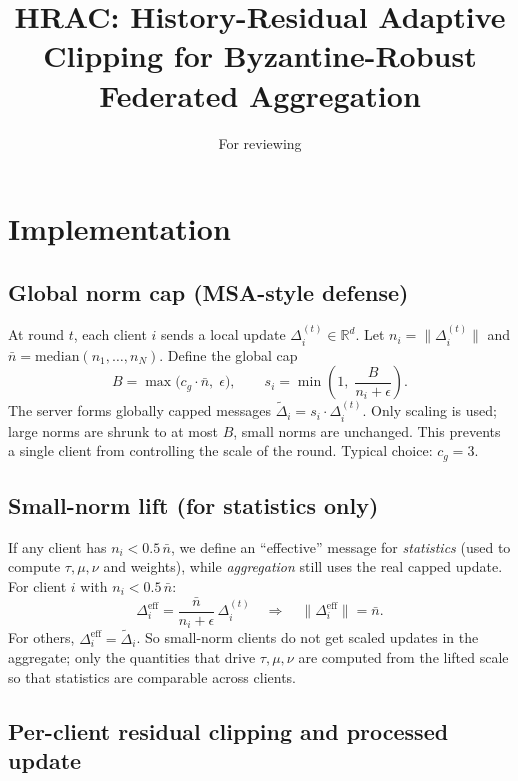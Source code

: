 \documentclass[11pt,a4paper]{article}
\title{HRAC: History-Residual Adaptive Clipping for Byzantine-Robust Federated Aggregation}
\author{For reviewing}
\date{}
\begin{document}
\maketitle


\section{Implementation}

\subsection{Global norm cap (MSA-style defense)}

At round $t$, each client $i$ sends a local update $\Delta_i^{(t)} \in \mathbb{R}^d$. Let $n_i = \|\Delta_i^{(t)}\|$ and $\bar{n} = \mathrm{median}(n_1,\ldots,n_N)$. Define the global cap
\begin{equation}
  B = \max\bigl(c_g \cdot \bar{n},\; \epsilon\bigr), \qquad
  s_i = \min\left(1,\; \frac{B}{n_i + \epsilon}\right).
\end{equation}
The server forms globally capped messages $\widetilde{\Delta}_i = s_i \cdot \Delta_i^{(t)}$. Only scaling is used; large norms are shrunk to at most $B$, small norms are unchanged. This prevents a single client from controlling the scale of the round. Typical choice: $c_g = 3$.

\subsection{Small-norm lift (for statistics only)}

If any client has $n_i < 0.5\,\bar{n}$, we define an ``effective'' message for \emph{statistics} (used to compute $\tau,\mu,\nu$ and weights), while \emph{aggregation} still uses the real capped update. For client $i$ with $n_i < 0.5\,\bar{n}$:
\begin{equation}
  \Delta_i^{\mathrm{eff}} = \frac{\bar{n}}{n_i + \epsilon}\,\Delta_i^{(t)} \quad \Rightarrow \quad \|\Delta_i^{\mathrm{eff}}\| = \bar{n}.
\end{equation}
For others, $\Delta_i^{\mathrm{eff}} = \widetilde{\Delta}_i$. So small-norm clients do not get scaled updates in the aggregate; only the quantities that drive $\tau,\mu,\nu$ are computed from the lifted scale so that statistics are comparable across clients.

\subsection{Per-client residual clipping and processed update}
\end{document}
